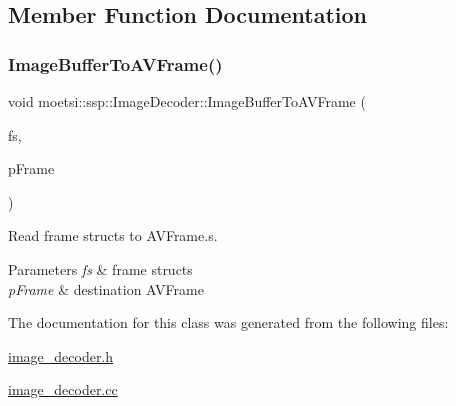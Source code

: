 \subsection{Member Function Documentation}
\mbox{\label{classmoetsi_1_1ssp_1_1ImageDecoder_a7a4e299977711727385c4c4e127453d2}} 
\subsubsection{\texorpdfstring{Image\+Buffer\+To\+A\+V\+Frame()}{ImageBufferToAVFrame()}}
{\footnotesize\ttfamily void moetsi\+::ssp\+::\+Image\+Decoder\+::\+Image\+Buffer\+To\+A\+V\+Frame (\begin{DoxyParamCaption}\item[{std\+::shared\+\_\+ptr$<$ \hyperlink{structmoetsi_1_1ssp_1_1FrameStruct}{Frame\+Struct} $>$ \&}]{fs,  }\item[{A\+V\+Frame\+SharedP}]{p\+Frame }\end{DoxyParamCaption})}



Read frame structs to A\+V\+Frame.\+s. 


\begin{DoxyParams}{Parameters}
{\em fs} & frame structs \\
\hline
{\em p\+Frame} & destination A\+V\+Frame \\
\hline
\end{DoxyParams}


The documentation for this class was generated from the following files\+:\begin{DoxyCompactItemize}
\item 
\hyperlink{image__decoder_8h}{image\+\_\+decoder.\+h}\item 
\hyperlink{image__decoder_8cc}{image\+\_\+decoder.\+cc}\end{DoxyCompactItemize}
